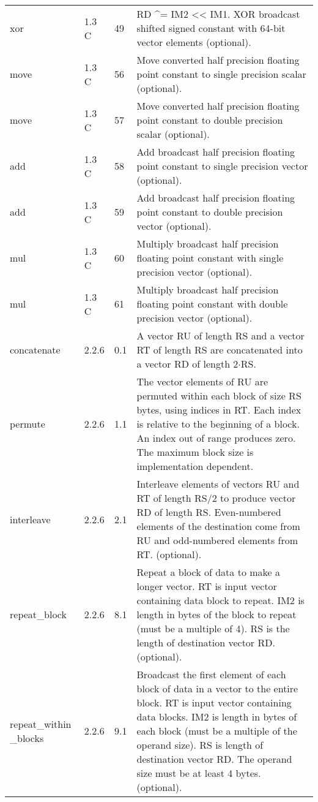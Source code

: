 \documentclass[forwardcom.tex]{subfiles}
\begin{document}
\begin{longtable} {|p{20mm}|p{10mm}|p{8mm}|p{75mm}|}
xor           & 1.3 C & 49 & RD \^{}= IM2 \textless\textless{} IM1. XOR broadcast shifted signed constant with 64-bit vector elements (optional). \\
move          & 1.3 C & 56 & Move converted half precision floating point constant to single
precision scalar (optional). \\
move          & 1.3 C & 57 & Move converted half precision floating point constant to double
precision scalar (optional). \\
add           & 1.3 C & 58 & Add broadcast half precision floating point constant to single
precision vector (optional). \\
add           & 1.3 C & 59 & Add broadcast half precision floating point constant to double
precision vector (optional). \\
mul           & 1.3 C & 60 & Multiply broadcast half precision floating point constant with single precision vector (optional). \\
mul           & 1.3 C & 61 & Multiply broadcast half precision floating point constant with double precision vector (optional). \\

concatenate   & 2.2.6 & 0.1 & A vector RU of length RS and a vector RT of length RS are
concatenated into a vector RD of length 2$\cdot$RS. \\

permute       & 2.2.6 & 1.1 & The vector elements of RU are permuted within each block of size RS bytes, using indices in RT. Each index is relative to the
beginning of a block. An index out of range produces zero. The
maximum block size is implementation dependent. \\

interleave    & 2.2.6 & 2.1 & Interleave elements of vectors RU and RT of length RS/2 to produce vector RD of length RS. Even-numbered elements of the destination come from RU and odd-numbered elements from RT. (optional). \\

repeat\_block  & 2.2.6 & 8.1 & Repeat a block of data to make a longer vector. RT is input vector containing data block to repeat. IM2 is length in bytes of the block to repeat (must be a multiple of 4). RS is the length of destination vector RD. (optional). \\

repeat\_within \_blocks & 2.2.6 & 9.1 & Broadcast the first element of each block of data in a vector to the entire block. RT is input vector containing data blocks. IM2 is length in bytes of each block (must be a multiple of the operand size). RS is length of destination vector RD. The operand size must be at least 4 bytes. (optional). \\


\end{longtable}
\end{document}
